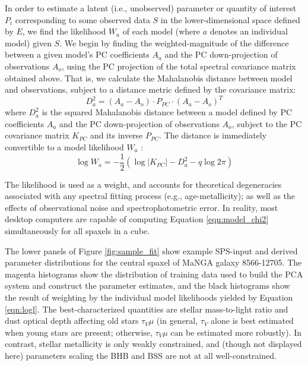 In order to estimate a latent (i.e., unobserved) parameter or quantity of interest $P_i$ corresponding to some observed data $S$ in the lower-dimensional space defined by $E$, we find the likelihood $W_a$ of each model (where $a$ denotes an individual model) given $S$. We begin by finding the weighted-magnitude of the difference between a given model's PC coefficients $A_a$ and the PC down-projection of observations $A_o$, using the PC projection of the total spectral covariance matrix obtained above. That is, we calculate the Mahalanobis distance \citep{mahalanobis_36} between model and observations, subject to a distance metric defined by the covariance matrix:
%
\begin{equation}
    D^2_a = (A_a - A_o) \cdot P_{PC} \cdot (A_a - A_o)^T
    \label{eqn:model_chi2}
\end{equation}
%
where $D^2_a$ is the squared Mahalanobis distance between a model defined by PC coefficients $A_a$ and the PC down-projection of observations $A_o$, subject to the PC covariance matrix $K_{PC}$ and its inverse $P_{PC}$. The distance is immediately convertible to a model likelihood $W_a$ \citep{GIRI197749}:
%
\begin{equation}
    \log{W_a} = -\frac{1}{2} (\log{|K_{PC}|} - D^2_a - q \log{2 \pi})
    \label{eqn:logl}
\end{equation}
%

The likelihood is used as a weight, and accounts for theoretical degeneracies associated with any spectral fitting process (e.g., age-metallicity); as well as the effects of observational noise and spectrophotometric error. In reality, most desktop computers are capable of computing Equation \ref{eqn:model_chi2} simultaneously for all spaxels in a cube.

The lower panels of Figure \ref{fig:sample_fit} show example SPS-input and derived parameter distributions for the central spaxel of MaNGA galaxy 8566-12705. The magenta histograms show the distribution of training data used to build the PCA system and construct the parameter estimates, and the black histograms show the result of weighting by the individual model likelihoods yielded by Equation \ref{eqn:logl}. The best-characterized quantities are stellar mass-to-light ratio and dust optical depth affecting old stars $\tau_V \mu$ (in general, $\tau_V$ alone is best estimated when young stars are present; otherwise, $\tau_V \mu$ can be estimated more robustly). In contrast, stellar metallicity is only weakly constrained, and (though not displayed here) parameters scaling the BHB and BSS are not at all well-constrained.

